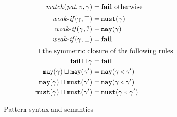 \documentclass[preprint,onecolumn,9pt]{sigplanconf} %
\begin{document}
\begin{figure}
\begin{align*}
\\
    \match(\mpat, \mdata, \mbindenv) &= \mfail \text{ otherwise}
\\[2pt]
    \weakif(\mbindenv, \top) &= \smust{\mbindenv}
\\
    \weakif(\mbindenv, ?) &= \smay{\mbindenv}
\\
    \weakif(\mbindenv, \bot) &= \mfail
\\[2pt]
    \sqcup\span \text{ the symmetric closure of the following rules}
\\
    \mfail \sqcup \mbindenv &= \mfail
\\
    \smay{\mbindenv} \sqcup \smay{\mbindenv'} &= \smay{\combinef{\mbindenv}{\mbindenv'}}
\\
    \smay{\mbindenv} \sqcup \smust{\mbindenv'} &= \smay{\combinef{\mbindenv}{\mbindenv'}}
\\
    \smust{\mbindenv} \sqcup \smust{\mbindenv'} &= \smust{\combinef{\mbindenv}{\mbindenv'}}
  \end{align*}
  \caption{Pattern syntax and semantics}
  \label{fig:pattern-syntax}
\end{figure}
\end{document}
